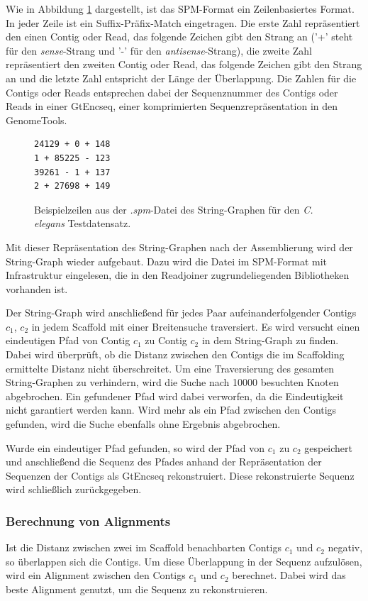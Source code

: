 \documentclass[a4paper,10pt,parskip]{scrartcl}
\begin{document}
Wie in Abbildung \ref{abb: spm} dargestellt, ist das SPM-Format ein
Zeilenbasiertes Format. In jeder Zeile ist ein Suffix-Präfix-Match
eingetragen. Die erste Zahl repräsentiert den einen Contig oder Read,
das folgende Zeichen gibt den Strang an ('+' steht für den
\textit{sense}-Strang und '-' für den \textit{antisense}-Strang), die
zweite Zahl repräsentiert den zweiten Contig oder Read, das folgende
Zeichen gibt den Strang an und die letzte Zahl entspricht der Länge
der Überlappung. Die Zahlen für die Contigs oder Reads entsprechen
dabei der Sequenznummer des Contigs oder Reads in einer GtEncseq,
einer komprimierten Sequenzrepräsentation in den GenomeTools.

\begin{figure}
  \centering
\begin{verbatim}
24129 + 0 + 148
1 + 85225 - 123
39261 - 1 + 137
2 + 27698 + 149
\end{verbatim}
\caption{\label{abb: spm}Beispielzeilen aus der \textit{.spm}-Datei des
  String-Graphen für den \textit{C. elegans} Testdatensatz.}
\end{figure}

Mit dieser Repräsentation des String-Graphen nach der Assemblierung
wird der String-Graph wieder aufgebaut. Dazu wird die Datei im
SPM-Format mit Infrastruktur eingelesen, die in den Readjoiner
zugrundeliegenden Bibliotheken vorhanden ist.

Der String-Graph wird anschließend für jedes Paar
aufeinanderfolgender Contigs $c_1$, $c_2$ in jedem Scaffold mit einer
Breitensuche traversiert. Es wird versucht einen eindeutigen Pfad von
Contig $c_1$ zu Contig $c_2$ in dem String-Graph zu finden. Dabei wird
überprüft, ob die Distanz zwischen den Contigs die im Scaffolding
ermittelte Distanz nicht überschreitet. Um eine Traversierung des
gesamten String-Graphen zu verhindern, wird die Suche nach \num{10000}
besuchten Knoten abgebrochen. Ein gefundener Pfad wird dabei
verworfen, da die Eindeutigkeit nicht garantiert werden kann. Wird
mehr als ein Pfad zwischen den Contigs gefunden, wird die Suche
ebenfalls ohne Ergebnis abgebrochen.

Wurde ein eindeutiger Pfad gefunden, so wird der Pfad von $c_1$ zu
$c_2$ gespeichert und anschließend die Sequenz des Pfades anhand der
Repräsentation der Sequenzen der Contigs als GtEncseq rekonstruiert.
Diese rekonstruierte Sequenz wird schließlich zurückgegeben.

\subsubsection{Berechnung von Alignments}
Ist die Distanz zwischen zwei im Scaffold benachbarten Contigs $c_1$
und $c_2$ negativ, so überlappen sich die Contigs. Um diese
Überlappung in der Sequenz aufzulösen, wird ein Alignment zwischen den
Contigs $c_1$ und $c_2$ berechnet. Dabei wird das beste Alignment
genutzt, um die Sequenz zu rekonstruieren.
\end{document}
